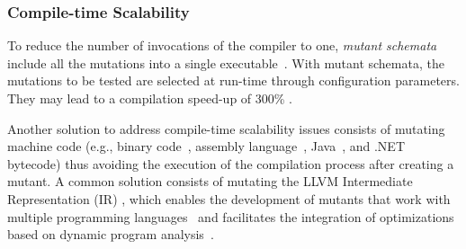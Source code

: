 %

\subsubsection{Compile-time Scalability}
\label{sec:compile:time}


To reduce the number of invocations of the compiler to one, \emph{mutant schemata} include all the mutations into a single executable~\cite{untch1993mutation}. 
With mutant schemata, the mutations to be tested are selected at run-time through configuration parameters. They may lead to a compilation speed-up of 300\% \cite{papadakis2010automatic}. 


Another solution to address compile-time scalability issues consists of mutating machine code  (e.g., binary code~\cite{becker2012xemu}, assembly language~\cite{crouzet2006sesame},
Java~\cite{ma2006mujava}, 
 and
.NET~\cite{derezinska2011object} bytecode) thus avoiding the execution of the compilation process after creating a mutant. 
A common solution consists of mutating the
 LLVM Intermediate Representation (IR) \cite{hariri2016evaluating}, 
which enables the development of mutants that work with multiple programming languages~\cite{hariri2019comparing} and facilitates the integration of optimizations based on dynamic program analysis~\cite{denisov2018mull}.


